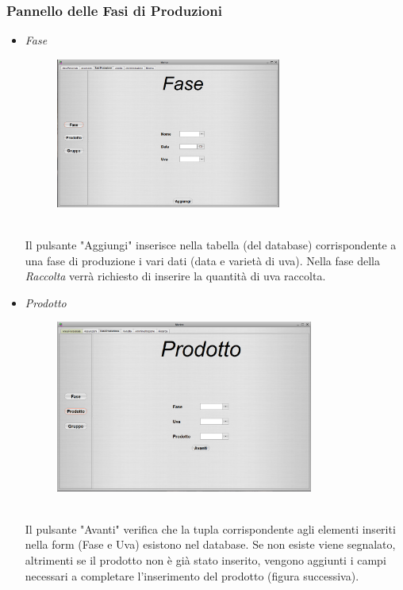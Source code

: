 \documentclass{article}
\begin{document}
\subsubsection{Pannello delle Fasi di Produzioni}
\begin{itemize}
\item \textit{Fase}\\
\begin{figure}[htbp]
\centering
\includegraphics[width=0.7\textwidth]{img/panel_phase.png}
\end{figure}\\
Il pulsante "Aggiungi" inserisce nella tabella (del database) corrispondente a una fase di produzione i vari dati (data e varietà di uva). Nella fase della \textit{Raccolta} verrà richiesto di inserire la quantità di uva raccolta.\\
\newpage
\item \textit{Prodotto}\\
\begin{figure}[htbp]
\centering
\includegraphics[width=0.8\textwidth]{img/panel_product.png}
\end{figure}\\
Il pulsante "Avanti" verifica che la tupla corrispondente agli elementi inseriti nella form (Fase e Uva) esistono nel database. Se non esiste viene segnalato, altrimenti se il prodotto non è già stato inserito, vengono aggiunti i campi necessari a completare l'inserimento del prodotto (figura successiva).

\end{itemize}
\end{document}
